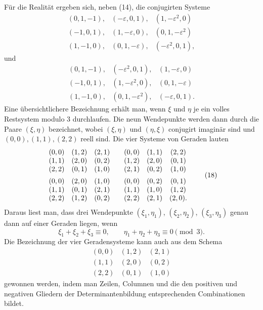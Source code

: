 \documentclass[11pt]{article}
\begin{document}
Für die Realität ergeben sich, neben (14), die conjugirten Systeme
\begin{equation}
\begin{array}{ccc}
(0,1,-1),&(-\varepsilon,0,1),&(1,-\varepsilon^2,0)\\
(-1,0,1),&(1,-\varepsilon,0),&(0,1,-\varepsilon^2)\\
(1,-1,0),&(0,1,-\varepsilon),&(-\varepsilon^2,0,1),
\end{array}
\tag{16}
\end{equation}
und
\begin{equation}
\begin{array}{ccc}
(0,1,-1),&(-\varepsilon^2,0,1),&(1,-\varepsilon,0)\\
(-1,0,1),&(1,-\varepsilon^2,0),&(0,1,-\varepsilon)\\
(1,-1,0),&(0,1,-\varepsilon^2),&(-\varepsilon,0,1).
\end{array}
\tag{17}
\end{equation}
Eine übersichtlichere Bezeichnung erhält man, wenn $\xi$ und $\eta$ je ein volles Restsystem modulo $3$ durchlaufen. Die neun Wendepunkte werden dann durch die Paare $(\xi,\eta)$ bezeichnet, wobei $(\xi,\eta)$ und $(\eta,\xi)$ conjugirt imaginär sind und $(0,0),(1,1),(2,2)$ reell sind. Die vier Systeme von Geraden lauten
\begin{equation}
\begin{array}{ccc@{\qquad}ccc}
(0,0)&(1,2)&(2,1)&(0,0)&(1,1)&(2,2)\\
(1,1)&(2,0)&(0,2)&(1,2)&(2,0)&(0,1)\\
(2,2)&(0,1)&(1,0)&(2,1)&(0,2)&(1,0)\\[0.5em]
(0,0)&(2,0)&(1,0)&(0,0)&(0,2)&(0,1)\\
(1,1)&(0,1)&(2,1)&(1,1)&(1,0)&(1,2)\\
(2,2)&(1,2)&(0,2)&(2,2)&(2,1)&(2,0).
\end{array}
\tag{18}
\end{equation}
Daraus liest man, dass drei Wendepunkte $(\xi_1,\eta_1)$, $(\xi_2,\eta_2)$, $(\xi_3,\eta_3)$ genau dann auf einer Geraden liegen, wenn
\begin{equation}
 \xi_1+\xi_2+\xi_3\equiv0,
 \qquad
 \eta_1+\eta_2+\eta_3\equiv0
 \pmod 3.
 \tag{19}
\end{equation}
Die Bezeichnung der vier Geradensysteme kann auch aus dem Schema
\begin{equation}
\begin{array}{ccc}
(0,0)&(1,2)&(2,1)\\
(1,1)&(2,0)&(0,2)\\
(2,2)&(0,1)&(1,0)
\end{array}
\tag{20}
\end{equation}
gewonnen werden, indem man Zeilen, Columnen und die den positiven und negativen Gliedern der Determinantenbildung entsprechenden Combinationen bildet.
\end{document}
